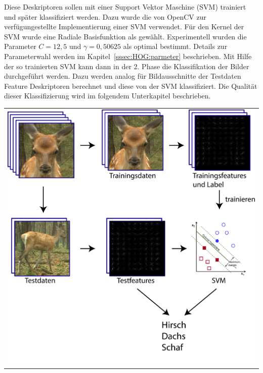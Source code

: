 Diese Deskriptoren sollen mit einer Support Vektor Maschine (SVM) trainiert und später klassifiziert werden. Dazu wurde die von OpenCV zur verfügungestellte Implementierung einer SVM verwendet. Für den Kernel der SVM wurde eine Radiale Basisfunktion als gewählt. Experimentell wurden die Parameter $C = 12,5$ und $\gamma = 0,50625$ als optimal bestimmt. Details zur Parameterwahl werden im Kapitel~\ref{sssec:HOG:parmeter} beschrieben.
Mit Hilfe der so trainierten SVM kann dann in der 2. Phase die Klassifikation der Bilder durchgeführt werden. Dazu werden analog für Bildausschnitte der Testdaten Feature Deskriptoren berechnet und diese von der SVM klassifiziert. Die Qualität dieser Klassifizierung wird im folgendem Unterkapitel beschrieben.
\begin{center}
\begin{tabular}{c}
\includegraphics[trim={0 0cm 0cm 0cm},clip=true,width=13cm]{img/ClassificationOverview.png}
\end{tabular}
\label{fig:hog_classification_ov}
\end{center}


